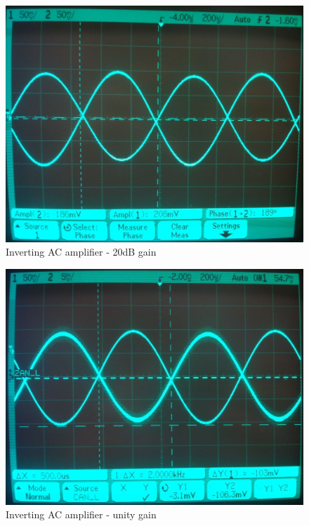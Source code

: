 \documentclass[]{article}
\begin{document}
\begin{figure}[htbp]
    \centering
    \includegraphics[scale=0.2]{img/invACamp-x10.jpg}
    \caption{Inverting AC amplifier - 20dB gain}
    \label{fig:invACamp20dB_scope}
\end{figure}

\begin{figure}[htbp]
    \centering
    \includegraphics[scale=0.2]{img/invACamp-x1.jpg}
    \caption{Inverting AC amplifier - unity gain}
    \label{fig:invACampunity_scope}
\end{figure}


\end{document}
